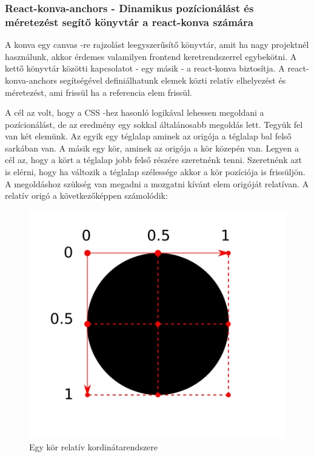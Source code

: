 \documentclass[a4paper,12pt,oneside]{report}
\begin{document}
\subsubsection{React-konva-anchors - Dinamikus pozícionálást és méretezést segítő könyvtár a react-konva számára}

\begin{justify}

	A konva egy canvas -re rajzolást leegyszerűsítő könyvtár, amit ha nagy projektnél használunk, akkor érdemes valamilyen frontend keretrendszerrel egybekötni. A kettő könyvtár közötti kapcsolatot - egy másik - a react-konva biztosítja. A react-konva-anchors segítségével definiálhatunk elemek közti relatív elhelyezést és méretezést, ami frissül ha a referencia elem frissül. 

	A cél az volt, hogy a CSS -hez hasonló logikával lehessen megoldani a pozícionálást, de az eredmény egy sokkal általánosabb megoldás lett. Tegyük fel van két elemünk. Az egyik egy téglalap aminek az origója a téglalap bal felső sarkában van. A másik egy kör, aminek az origója a kör közepén van. Legyen a cél az, hogy a kört a téglalap jobb felső részére szeretnénk tenni. Szeretnénk azt is elérni, hogy ha változik a téglalap szélessége akkor a kör pozíciója is frissüljön. A megoldáshoz szükség van megadni a mozgatni kívánt elem origóját relatívan. A relatív origó a következőképpen számolódik:

	\begin{figure}[h]
		\includegraphics[width=\textwidth]{contents/images/position_anchor.png}
		\caption{ Egy kör relatív kordinátarendszere}
		\label{fig:position_anchor}
	\end{figure}


\end{justify}
\end{document}
